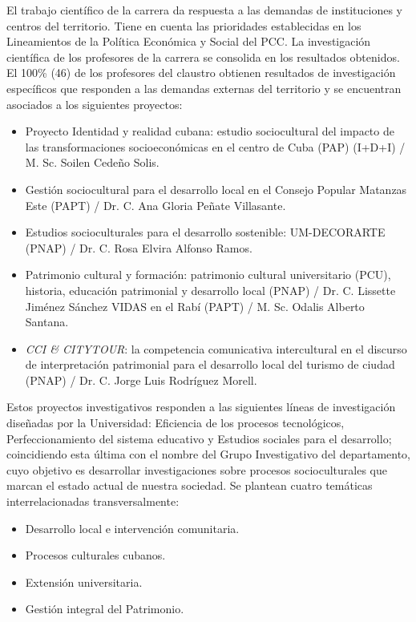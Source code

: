 El trabajo científico de la carrera da respuesta a las demandas de instituciones y centros del territorio. Tiene en cuenta las prioridades establecidas en los Lineamientos de la Política Económica y Social del PCC. La investigación científica de los profesores de la carrera se consolida en los resultados obtenidos. 
El 100\% (46) de los profesores del claustro obtienen resultados de investigación específicos que responden a las demandas externas del territorio y se encuentran asociados a los siguientes proyectos:

\begin{itemize}
	\item Proyecto Identidad y realidad cubana: estudio sociocultural del impacto de las transformaciones socioeconómicas en el centro de Cuba (PAP) (I+D+I) / M. Sc. Soilen Cedeño Solis.
	\item Gestión sociocultural para el desarrollo local en el Consejo Popular Matanzas Este (PAPT) / Dr. C. Ana Gloria Peñate Villasante.
	\item Estudios socioculturales para el desarrollo sostenible: UM-DECORARTE (PNAP) / Dr. C. Rosa Elvira Alfonso Ramos.
	\item Patrimonio cultural y formación: patrimonio cultural universitario (PCU), historia, educación patrimonial y desarrollo local (PNAP) / Dr. C. Lissette Jiménez Sánchez
	VIDAS en el Rabí (PAPT) / M. Sc. Odalis Alberto Santana.
	\item \emph{CCI \& CITYTOUR}:  la competencia comunicativa intercultural en el discurso de interpretación patrimonial para el desarrollo local del turismo de ciudad (PNAP) / Dr. C. Jorge Luis Rodríguez Morell.
	
\end{itemize}

Estos proyectos investigativos responden a las siguientes líneas de investigación diseñadas por la Universidad: Eficiencia de los procesos tecnológicos, Perfeccionamiento del sistema educativo y Estudios sociales para el desarrollo; coincidiendo esta última con el nombre del Grupo Investigativo del departamento, cuyo objetivo es desarrollar investigaciones sobre procesos socioculturales que marcan el estado actual de nuestra sociedad. Se plantean cuatro temáticas interrelacionadas transversalmente: 

\begin{itemize}
	\item Desarrollo local e intervención comunitaria.
	\item Procesos culturales cubanos.
	\item Extensión universitaria.
	\item Gestión integral del Patrimonio.
\end{itemize}

